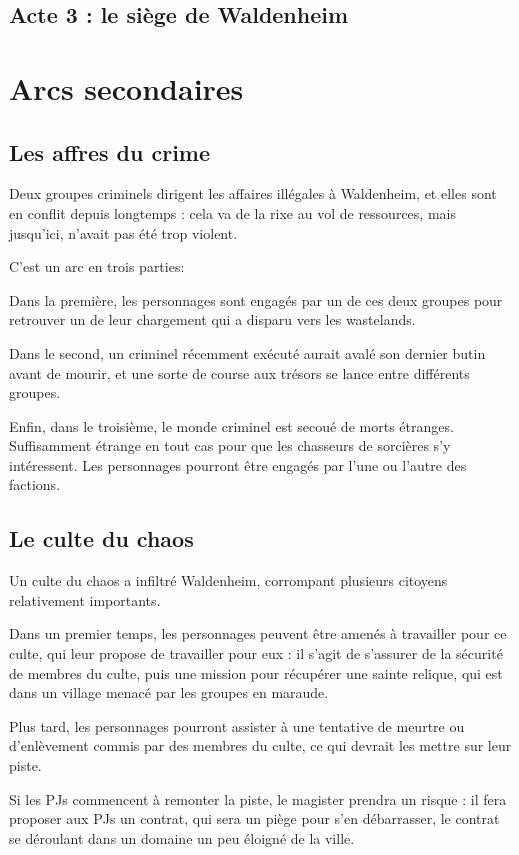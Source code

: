 \documentclass[10pt,a4paper]{book}
\begin{document}
\subsection{Acte 3 : le siège de Waldenheim}
\section{Arcs secondaires}
\subsection{Les affres du crime}
Deux groupes criminels dirigent les affaires illégales à Waldenheim, et elles sont en conflit depuis longtemps : cela va de la rixe au vol de ressources, mais jusqu'ici, n'avait pas été trop violent. 

C'est un arc en trois parties:

Dans la première, les personnages sont engagés par un de ces deux groupes pour retrouver un de leur chargement qui a disparu vers les wastelands. 

Dans le second, un criminel récemment exécuté aurait avalé son dernier butin avant de mourir, et une sorte de course aux trésors se lance entre différents groupes.

Enfin, dans le troisième, le monde criminel est secoué de morts étranges. Suffisamment étrange en tout cas pour que les chasseurs de sorcières s'y intéressent. Les personnages pourront être engagés par l'une ou l'autre des factions.
\subsection{Le culte du chaos}
Un culte du chaos a infiltré Waldenheim, corrompant plusieurs citoyens relativement importants.

Dans un premier temps, les personnages peuvent être amenés à travailler pour ce culte, qui leur propose de travailler pour eux : il s'agit de s'assurer de la sécurité de membres du culte, puis une mission pour récupérer une sainte relique, qui est dans un village menacé par les groupes en maraude.

Plus tard, les personnages pourront assister à une tentative de meurtre ou d'enlèvement commis par des membres du culte, ce qui devrait les mettre sur leur piste.

Si les PJs commencent à remonter la piste, le magister prendra un risque : il fera proposer aux PJs un contrat, qui sera un piège pour s'en débarrasser, le contrat se déroulant dans un domaine un peu éloigné de la ville.
\end{document}
